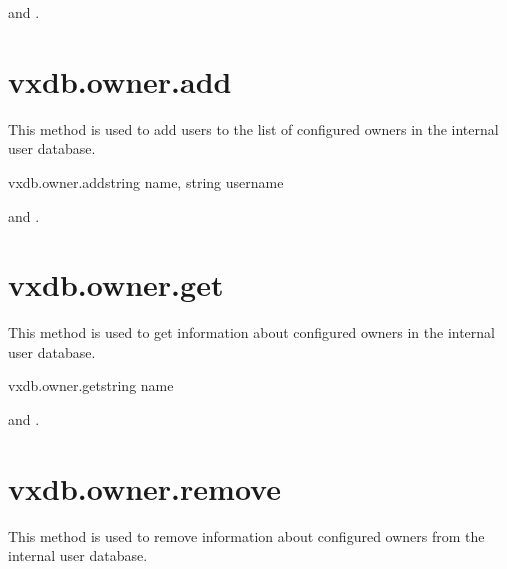\begin{rpcaccess}
 and \rpcownerchecks.
\end{rpcaccess}

\rpcreturnnil

\rpcnoerrors


\section{vxdb.owner.add}

This method is used to add users to the list of configured owners in the
internal user database.

\begin{rpcsynopsis}{vxdb.owner.add}{string name, string username}
\end{rpcsynopsis}

\begin{rpcaccess}
 and \rpcnoownerchecks.
\end{rpcaccess}

\rpcreturnnil

\rpcnoerrors


\section{vxdb.owner.get}

This method is used to get information about configured owners in the internal
user database.

\begin{rpcsynopsis}{vxdb.owner.get}{string name}
\end{rpcsynopsis}

\begin{rpcaccess}
 and \rpcnoownerchecks.
\end{rpcaccess}


\rpcnoerrors


\section{vxdb.owner.remove}

This method is used to remove information about configured owners from the
internal user database.

